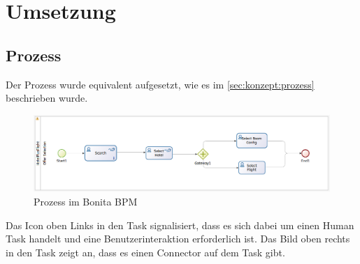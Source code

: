 

\chapter{Umsetzung}
\label{sec:umsetzung}

\section{Prozess}
Der Prozess wurde equivalent aufgesetzt, wie es im \cref{sec:konzept:prozess}  beschrieben wurde.

\begin{figure}[H]
	\centering
	\includegraphics[width=1\textwidth]{images/umsetzung-prozess.png}
	\caption{Prozess im Bonita BPM}
	\label{fig:umsetzung:prozess}
\end{figure}
Das Icon oben Links in den Task signalisiert, dass es sich dabei um einen Human Task handelt und eine Benutzerinteraktion erforderlich ist. Das Bild oben rechts in den Task zeigt an, dass es einen Connector auf dem Task gibt.

